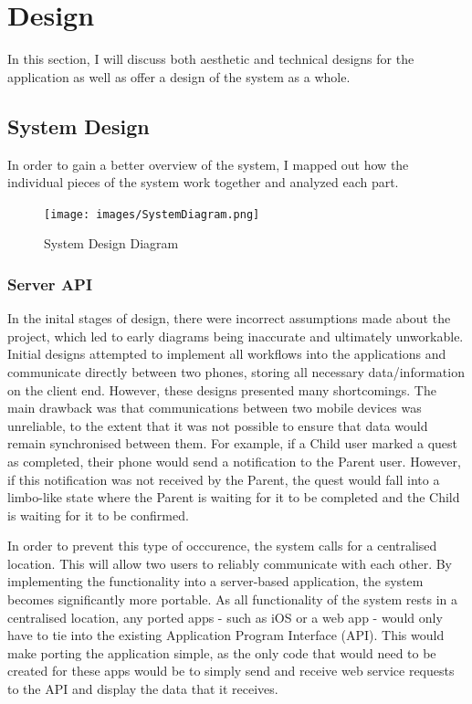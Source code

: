\chapter{Design}
In this section, I will discuss both aesthetic and technical designs for the application as well as offer a design of the system as a whole.

\section{System Design}
In order to gain a better overview of the system, I mapped out how the individual pieces of the system work together and analyzed each part.

\begin{figure}[ht]
	\centering
	\texttt{[image: images/SystemDiagram.png]}
	\caption{System Design Diagram}
	\label{fig:systemdesign}
\end{figure} 

\subsection{Server API}
In the inital stages of design, there were incorrect assumptions made about the project, which led to early diagrams being inaccurate and ultimately unworkable.
Initial designs attempted to implement all workflows into the applications and communicate directly between two phones, storing all necessary data/information on the client end. 
However, these designs presented many shortcomings. The main drawback was that communications between two mobile devices was unreliable, to the extent that it was not possible to ensure that data would remain synchronised between them.
For example, if a Child user marked a quest as completed, their phone would send a notification to the Parent user.
However, if this notification was not received by the Parent, the quest would fall into a limbo-like state where the Parent is waiting for it to be completed and the Child is waiting for it to be confirmed.

In order to prevent this type of occcurence, the system calls for a centralised location. This will allow two users to reliably communicate with each other.
By implementing the functionality into a server-based application, the system becomes significantly more portable. 
As all functionality of the system rests in a centralised location, any ported apps - such as iOS or a web app - would only have to tie into the existing Application Program Interface (API).
This would make porting the application simple, as the only code that would need to be created for these apps would be to simply send and receive web service requests to the API and display the data that it receives.

